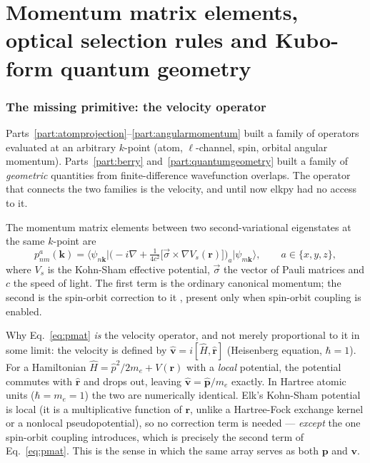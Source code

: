 \documentclass[11pt]{article}
\begin{document}
\part{Momentum matrix elements, optical selection rules and Kubo-form quantum geometry}
\label{part:momentum}

\section{The missing primitive: the velocity operator}

Parts~\ref{part:atomprojection}--\ref{part:angularmomentum} built a family of operators
evaluated at an arbitrary $k$-point (atom, $\ell$-channel, spin, orbital angular
momentum). Parts~\ref{part:berry} and~\ref{part:quantumgeometry} built a family of
\emph{geometric} quantities from finite-difference wavefunction overlaps. The operator
that connects the two families is the velocity, and until now elkpy had no access to it.

The momentum matrix elements between two second-variational eigenstates at the same
$k$-point are
\begin{equation}
  p^a_{nm}(\mathbf k) = \big\langle \psi_{n\mathbf k}\big|
    \Big(-i\nabla + \tfrac{1}{4c^2}\big[\vec\sigma\times\nabla V_s(\mathbf r)\big]\Big)_a
  \big|\psi_{m\mathbf k}\big\rangle,
  \qquad a\in\{x,y,z\},
  \label{eq:pmat}
\end{equation}
where $V_s$ is the Kohn-Sham effective potential, $\vec\sigma$ the vector of Pauli
matrices and $c$ the speed of light. The first term is the ordinary canonical momentum;
the second is the spin-orbit correction to it \cite{rathgen2004}, present only when
spin-orbit coupling is enabled.

Why Eq.~\eqref{eq:pmat} \emph{is} the velocity operator, and not merely proportional to
it in some limit: the velocity is defined by $\hat{\mathbf v}=i[\hat H,\hat{\mathbf r}]$
(Heisenberg equation, $\hbar=1$). For a Hamiltonian $\hat H=\hat p^2/2m_e+V(\mathbf r)$
with a \emph{local} potential, the potential commutes with $\hat{\mathbf r}$ and drops
out, leaving $\hat{\mathbf v}=\hat{\mathbf p}/m_e$ exactly. In Hartree atomic units
($\hbar=m_e=1$) the two are numerically identical. Elk's Kohn-Sham potential is local
(it is a multiplicative function of $\mathbf r$, unlike a Hartree-Fock exchange kernel or
a nonlocal pseudopotential), so no correction term is needed --- \emph{except} the one
spin-orbit coupling introduces, which is precisely the second term of
Eq.~\eqref{eq:pmat}. This is the sense in which the same array serves as both $\mathbf p$
and $\mathbf v$.
\end{document}
